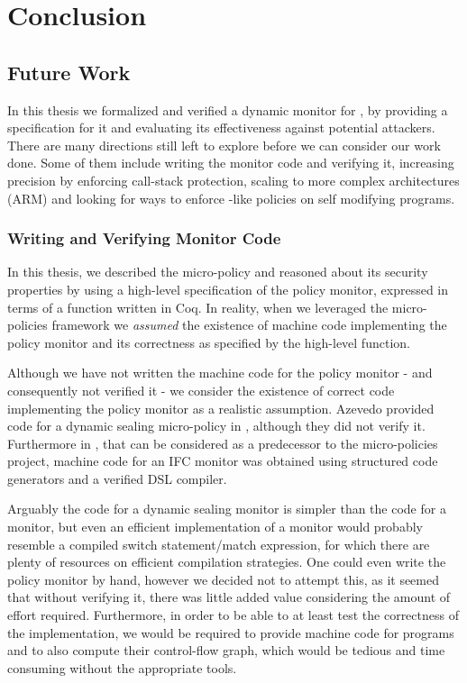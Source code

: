 \chapter{Conclusion}

\section{Future Work}

In this thesis we formalized and verified a dynamic monitor for \CFI,
by providing a specification for it and evaluating its effectiveness
against potential attackers. There are many directions still left to
explore before we can consider our work done. Some of them include
writing the \CFI monitor code and verifying it, increasing precision
by enforcing call-stack protection, scaling to more complex
architectures (\EG ARM) and looking for ways to enforce \CFI-like policies on
self modifying programs.

\subsection{Writing and Verifying Monitor Code}

In this thesis, we described the \CFI micro-policy and reasoned about
its security properties by using a high-level specification of the
policy monitor, expressed in terms of a \TRANSFER function written in
Coq. In reality, when we leveraged the micro-policies framework we
\emph{assumed} the existence of machine code implementing the \CFI
policy monitor and its correctness as specified by the high-level
\TRANSFER function.

Although we have not written the machine code for the policy monitor -
and consequently not verified it - we consider the existence of
correct code implementing the policy monitor as a realistic
assumption. Azevedo \ETAL provided code for a dynamic sealing
micro-policy in \cite{popl2015}, although they did not verify it.
Furthermore in \cite{PicoCoq2013}, that can be considered as a predecessor
to the micro-policies project, machine code for an IFC
monitor was obtained using structured code generators and a verified
DSL compiler.

Arguably the code for a dynamic sealing monitor is simpler than the
code for a \CFI monitor, but even an efficient implementation of a
\CFI monitor would probably resemble a compiled switch statement/match
expression, for which there are plenty of resources on efficient
compilation strategies. One could even write the \CFI policy monitor
by hand, however we decided not to attempt this, as it seemed that
without verifying it, there was little added value considering the
amount of effort required. Furthermore, in order to be able to at
least test the correctness of the implementation, we would be required
to provide machine code for programs and to also compute their control-flow
graph, which would be tedious and time consuming without the appropriate tools.

